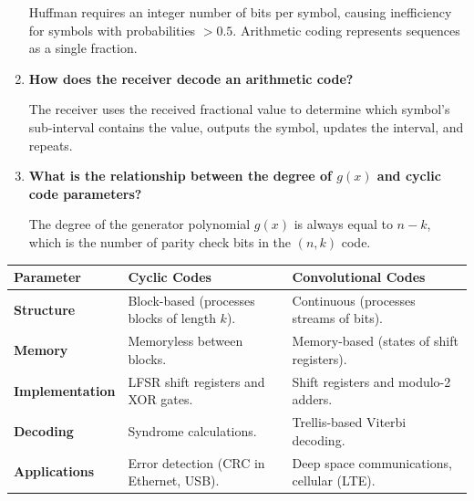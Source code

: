 \documentclass[12pt,a4paper]{article}
\newcommand{\Q}[1]{\textbf{#1}\par\noindent\ignorespaces}
\renewcommand{\arraystretch}{1.45}
\begin{document}
\begin{tcolorbox}[exambox, title={\textbf{Frequently Asked / Viva Questions}}]
\begin{enumerate}[topsep=0pt, label=\textbf{Q\arabic*.}, itemsep=5pt]
    Huffman requires an integer number of bits per symbol, causing inefficiency for symbols with probabilities $>0.5$. Arithmetic coding represents sequences as a single fraction.
  \item \Q{How does the receiver decode an arithmetic code?}
    The receiver uses the received fractional value to determine which symbol's sub-interval contains the value, outputs the symbol, updates the interval, and repeats.
  \item \Q{What is the relationship between the degree of $g(x)$ and cyclic code parameters?}
    The degree of the generator polynomial $g(x)$ is always equal to $n-k$, which is the number of parity check bits in the $(n, k)$ code.
\end{enumerate}
\end{tcolorbox}

\begin{tcolorbox}[tikzbox, title={Comparison of Coding Techniques}]
\renewcommand{\arraystretch}{1.45}
\par\noindent
\begin{tabularx}{\linewidth}{|B{3.2cm}|Y|Y|}
\hline
\textbf{Parameter} & \textbf{\color{myteal}Cyclic Codes} & \textbf{\color{mygreen}Convolutional Codes} \\
\hline
\textbf{Structure} & Block-based (processes blocks of length $k$). & Continuous (processes streams of bits). \\
\hline
\textbf{Memory} & Memoryless between blocks. & Memory-based (states of shift registers). \\
\hline
\textbf{Implementation} & LFSR shift registers and XOR gates. & Shift registers and modulo-2 adders. \\
\hline
\textbf{Decoding} & Syndrome calculations. & Trellis-based Viterbi decoding. \\
\hline
\textbf{Applications} & Error detection (CRC in Ethernet, USB). & Deep space communications, cellular (LTE). \\
\hline
\end{tabularx}
\end{tcolorbox}
\end{document}
